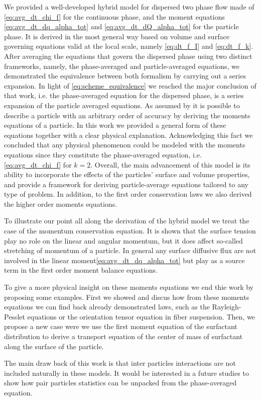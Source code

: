We provided a well-developed hybrid model for dispersed two phase flow made of \ref{eq:avg_dt_chi_f} for the continuous phase, and the moment equations \ref{eq:avg_dt_dq_alpha_tot} and \ref{eq:avg_dt_dQ_alpha_tot} for the particle phase. 
It is derived in the most general way based on volume and surface governing equations valid at the local scale, namely \ref{eq:dt_f_I} and \ref{eq:dt_f_k}. 
After averaging the equations that govern the dispersed phase using two distinct frameworks, namely, the phase-averaged and particle-averaged equations, we demonstrated the equivalence between both formalism by carrying out a series expansion. 
In light of \ref{eq:scheme_equivalence} we reached the major conclusion of that work, i.e.  the phase-averaged equation for the dispersed phase, is a series expansion of the particle averaged equations.  
As assumed by \citet{zhang1997momentum} it is possible to describe a particle with an arbitrary order of accuracy by deriving the moments equations of a particle. 
In this work we provided a general form of these equations together with a clear physical explanation. 
Acknowledging this fact we concluded that  any physical phenomenon could be modeled with the moments equations since they constitute the phase-averaged equation, i.e. \ref{eq:avg_dt_chi_f} for $k =2$. 
Overall, the main advancement of this model is its ability to incorporate the effects of the particles' surface and volume properties, and provide a framework for deriving particle-average equations tailored to any type of problem.
In addition, to the first order conservation laws we also derived the higher order moments equations. 

To illustrate our point all along the derivation of the hybrid model we treat the case of the momentum conservation equation. 
It is shown that the surface tension play no role on the linear and angular momentum, but it does  affect so-called stretching of momentum of a particle. 
In general any surface diffusive flux are not involved in the linear moment\ref{eq:avg_dt_dq_alpha_tot} but play as a source term in the first order moment balance equations. 

To give a more physical insight on these moments equations we end thie work by proposing some examples. 
First we showed and discus how from these moments equations we can find back already demonstrated laws, such as the Rayleigh-Pesslet equations or the orientation tensor equation in fiber suspension. 
Then, we propose a new case were we use the first moment equation of the surfactant distribution to derive a transport equation of the center of mass of surfactant along the surface of the particle. 

The main draw back of this work is that inter particles interactions are not included naturally in these models. 
It would be interested in a future studies to show how pair particles statistics can be unpacked from the phase-averaged equation. 

